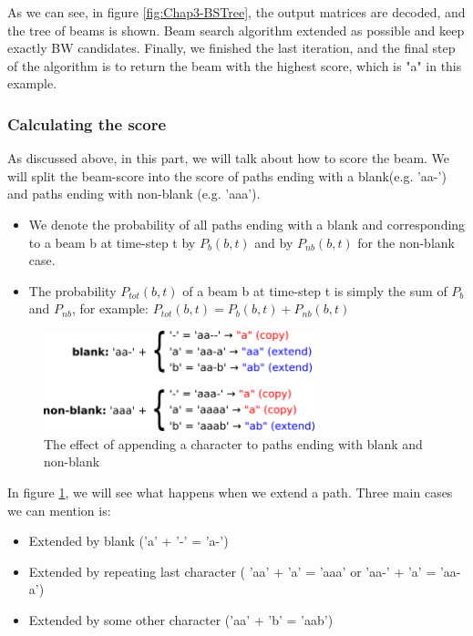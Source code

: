 As we can see, in figure \ref{fig:Chap3-BSTree}, the output matrices are decoded, and the tree of beams is shown. Beam search algorithm extended as possible and keep exactly BW candidates. Finally, we finished the last iteration, and the final step of the algorithm is to return the beam with the highest score, which is "a" in this example.

\subsubsection{Calculating the score}

As discussed above, in this part, we will talk about how to score the beam. We will split the beam-score into the score of paths ending with a blank(e.g. 'aa-') and paths ending with non-blank (e.g. 'aaa').

\begin{itemize}
	\item We denote the probability of all paths ending with a blank and corresponding to a beam b at time-step t
	      by $ P_{b}(b,t) $ and by $ P_{nb}(b,t) $ for the non-blank case.
	\item The probability $P_{tot}(b,t)$ of a beam b at time-step t is simply the sum of $P_b$ and $P_{nb}$, for example:
	      $P_{tot}(b,t) = P_b(b,t) + P_{nb}(b,t)$
\end{itemize}

\begin{figure}[H]
	\centering
	\includegraphics[width=0.7\textwidth]{img/Chap3/CTC_Scoring}
	\caption{ The effect of appending a character to paths ending with blank and non-blank }
	\label{fig:Chap3-CTC_Scoring}
\end{figure}

In figure \ref{fig:Chap3-CTC_Scoring}, we will see what happens when we extend a path. Three main cases we can mention
is:
\begin{itemize}
	\item Extended by blank ('a' + '-' = 'a-')
	\item Extended by repeating last character ( 'aa' + 'a' = 'aaa' or 'aa-' + 'a' = 'aa-a')
	\item Extended by some other character ('aa' + 'b' = 'aab')
\end{itemize}

